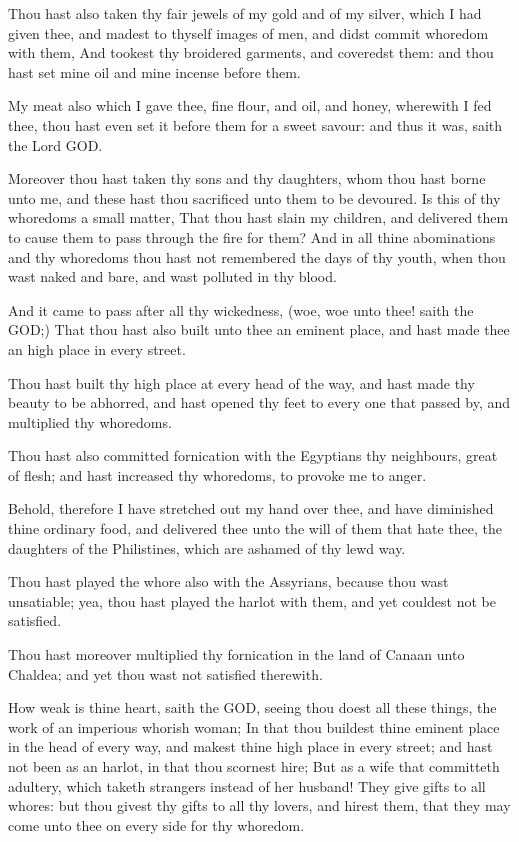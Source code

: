 \verse Thou hast also taken thy fair jewels of my gold and of my silver, which I had given thee, and madest to thyself images of men, and didst commit whoredom with them, \verse And tookest thy broidered garments, and coveredst them: and thou hast set mine oil and mine incense before them.

\verse My meat also which I gave thee, fine flour, and oil, and honey, wherewith I fed thee, thou hast even set it before them for a sweet savour: and thus it was, saith the Lord GOD.

\verse Moreover thou hast taken thy sons and thy daughters, whom thou hast borne unto me, and these hast thou sacrificed unto them to be devoured. Is this of thy whoredoms a small matter, \verse That thou hast slain my children, and delivered them to cause them to pass through the fire for them?  \verse And in all thine abominations and thy whoredoms thou hast not remembered the days of thy youth, when thou wast naked and bare, and wast polluted in thy blood.

\verse And it came to pass after all thy wickedness, (woe, woe unto thee!  saith the \LORD GOD;) \verse That thou hast also built unto thee an eminent place, and hast made thee an high place in every street.

\verse Thou hast built thy high place at every head of the way, and hast made thy beauty to be abhorred, and hast opened thy feet to every one that passed by, and multiplied thy whoredoms.

\verse Thou hast also committed fornication with the Egyptians thy neighbours, great of flesh; and hast increased thy whoredoms, to provoke me to anger.

\verse Behold, therefore I have stretched out my hand over thee, and have diminished thine ordinary food, and delivered thee unto the will of them that hate thee, the daughters of the Philistines, which are ashamed of thy lewd way.

\verse Thou hast played the whore also with the Assyrians, because thou wast unsatiable; yea, thou hast played the harlot with them, and yet couldest not be satisfied.

\verse Thou hast moreover multiplied thy fornication in the land of Canaan unto Chaldea; and yet thou wast not satisfied therewith.

\verse How weak is thine heart, saith the \LORD GOD, seeing thou doest all these things, the work of an imperious whorish woman; \verse In that thou buildest thine eminent place in the head of every way, and makest thine high place in every street; and hast not been as an harlot, in that thou scornest hire; \verse But as a wife that committeth adultery, which taketh strangers instead of her husband!  \verse They give gifts to all whores: but thou givest thy gifts to all thy lovers, and hirest them, that they may come unto thee on every side for thy whoredom.

